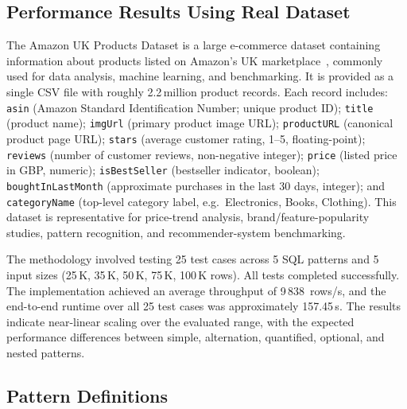 \subsection{Performance Results Using Real Dataset}
\label{subsec:eval-real-dataset}

The Amazon UK Products Dataset is a large e-commerce dataset
containing information about products listed on Amazon's UK
marketplace~\cite{asaniczka2023amazon}, commonly used for data
analysis, machine learning, and benchmarking.  It is provided as a
single CSV file with roughly 2.2\,million product records.  Each
record includes: \texttt{asin} (Amazon Standard Identification Number;
unique product ID); \texttt{title} (product name); \texttt{imgUrl}
(primary product image URL); \texttt{productURL} (canonical product
page URL); \texttt{stars} (average customer rating, 1--5,
floating-point); \texttt{reviews} (number of customer reviews,
non-negative integer); \texttt{price} (listed price in GBP, numeric);
\texttt{isBestSeller} (bestseller indicator, boolean);
\texttt{boughtInLastMonth} (approximate purchases in the last 30 days,
integer); and \texttt{categoryName} (top-level category label, e.g.\
Electronics, Books, Clothing).  This dataset is representative for
price-trend analysis, brand/feature-popularity studies, pattern
recognition, and recommender-system benchmarking.

The methodology involved testing 25 test cases across 5 SQL patterns
and 5 input sizes (25\,K, 35\,K, 50\,K, 75\,K, 100\,K rows).  All
tests completed successfully.  The implementation achieved an average
throughput of 9\,838~rows/s, and the end-to-end runtime over all 25
test cases was approximately 157.45\,s.  The results indicate
near-linear scaling over the evaluated range, with the expected
performance differences between simple, alternation, quantified,
optional, and nested patterns.

\subsection{Pattern Definitions}
\label{subsec:eval-pattern-defs}


